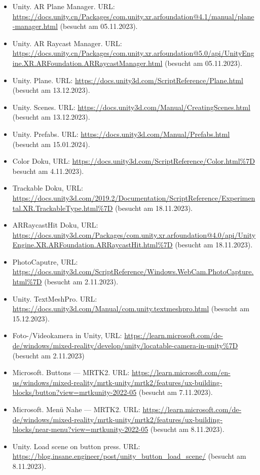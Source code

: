 \begin{itemize}
    \item Unity. AR Plane Manager. URL: \url{https://docs.unity.cn/Packages/com.unity.xr.arfoundation@4.1/manual/plane-manager.html} (besucht am 05.11.2023).
    \item Unity. AR Raycast Manager. URL: \url{https://docs.unity.cn/Packages/com.unity.xr.arfoundation@5.0/api/UnityEngine.XR.ARFoundation.ARRaycastManager.html} (besucht am 05.11.2023).
    \item Unity. Plane. URL: \url{https://docs.unity3d.com/ScriptReference/Plane.html} (besucht am 13.12.2023).
    \item Unity. Scenes. URL: \url{https://docs.unity3d.com/Manual/CreatingScenes.html} (besucht am 13.12.2023).
    \item Unity. Prefabs. URL: \url{https://docs.unity3d.com/Manual/Prefabs.html} (besucht am 15.01.2024).
    \item Color Doku, URL:  \url{https://docs.unity3d.com/ScriptReference/Color.html%7D} besucht am 4.11.2023).
    \item Trackable Doku, URL:  \url{https://docs.unity3d.com/2019.2/Documentation/ScriptReference/Experimental.XR.TrackableType.html%7D} (besucht am 18.11.2023).
    \item ARRaycastHit Doku, URL:  \url{https://docs.unity3d.com/Packages/com.unity.xr.arfoundation@4.0/api/UnityEngine.XR.ARFoundation.ARRaycastHit.html%7D} (besucht am 18.11.2023).
    \item PhotoCaputre, URL:  \url{https://docs.unity3d.com/ScriptReference/Windows.WebCam.PhotoCapture.html%7D} (besucht am 2.11.2023).
    \item Unity. TextMeshPro. URL: \url{https://docs.unity3d.com/Manual/com.unity.textmeshpro.html} (besucht am 15.12.2023).
    \item Foto-/Videokamera in Unity, URL:  \url{https://learn.microsoft.com/de-de/windows/mixed-reality/develop/unity/locatable-camera-in-unity%7D} (besucht am 2.11.2023)
    \item Microsoft. Buttons — MRTK2. URL: \url{https://learn.microsoft.com/en-us/windows/mixed-reality/mrtk-unity/mrtk2/features/ux-building-blocks/button?view=mrtkunity-2022-05} (besucht am 7.11.2023).
    \item Microsoft. Menü Nahe — MRTK2. URL: \url{https://learn.microsoft.com/de-de/windows/mixed-reality/mrtk-unity/mrtk2/features/ux-building-blocks/near-menu?view=mrtkunity-2022-05} (besucht am 8.11.2023).
    \item Unity. Load scene on button press. URL: \url{https://blog.insane.engineer/post/unity_button_load_scene/} (besucht am 8.11.2023).

\end{itemize}
